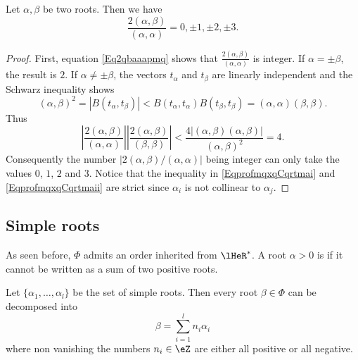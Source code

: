 \begin{proposition}
	Let \( \alpha,\beta\) be two roots. Then we have
	\begin{equation}
		\frac{2(\alpha,\beta)}{(\alpha,\alpha)}=0,\pm 1,\pm 2,\pm 3.
	\end{equation}
\end{proposition}

\begin{proof}
	First, equation \eqref{Eq2qbaaapmq} shows that \( \frac{2(\alpha,\beta)}{(\alpha,\alpha)}\) is integer. If \( \alpha=\pm\beta\), the result is \( 2\). If \( \alpha\neq\pm\beta\), the vectors \( t_{\alpha}\) and \( t_{\beta}\) are linearly independent and the Schwarz inequality shows
	\begin{equation}        \label{EqprofmqxqCqrtmai}
		(\alpha,\beta)^2=| B(t_{\alpha},t_{\beta}) |< B(t_{\alpha},t_{\alpha})B(t_{\beta},t_{\beta})=(\alpha,\alpha)(\beta,\beta).
	\end{equation}
	Thus
	\begin{equation}        \label{EqprofmqxqCqrtmaii}
		\left| \frac{2(\alpha,\beta)}{(\alpha,\alpha)} \right| \left| \frac{2(\alpha,\beta)}{(\beta,\beta)} \right| <\frac{ 4| (\alpha,\beta)(\alpha,\beta) | }{ (\alpha,\beta)^2 }=4.
	\end{equation}
	Consequently the number \( | 2(\alpha,\beta)/(\alpha,\alpha) |\) being integer can only take the values \( 0\), \( 1\), \( 2\) and \( 3\). Notice that the inequality in \eqref{EqprofmqxqCqrtmai} and \eqref{EqprofmqxqCqrtmaii} are strict since \( \alpha_i\) is not collinear to \( \alpha_j\).
\end{proof}

\subsection{Simple roots}
As seen before, $\Phi$ admits an order inherited from $\lHeR^*$. A root $\alpha>0$ is  if it cannot be written as a sum of two positive roots.

\begin{theorem}      \label{ThoposrootnjajnZ}
	Let \( \{ \alpha_1,\ldots,\alpha_l \}\) be the set of simple roots. Then every root \( \beta\in\Phi\) can be decomposed into
	\begin{equation}
		\beta=\sum_{i=1}^ln_i\alpha_i
	\end{equation}
	where non vanishing the numbers \( n_i\in\eZ\) are either all positive or all negative.
\end{theorem}


